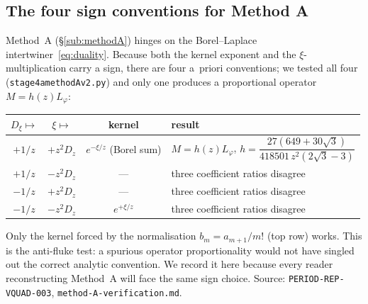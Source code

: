 \documentclass[11pt,reqno]{amsart}
\renewcommand{\_}{\vquadorigunderscore\allowbreak}
\theoremstyle{plain}
\theoremstyle{definition}
\newcommand{\Lphi}{L_{\varphi}}
\begin{document}
\subsection{The four sign conventions for Method A}\label{app:conventions}
Method~A (\S\ref{sub:methodA}) hinges on the Borel--Laplace intertwiner~\eqref{eq:duality}. Because
both the kernel exponent and the $\xi$-multiplication carry a sign, there are four a~priori
conventions; we tested all four (\texttt{stage4a\_methodA\_v2.py}) and only one produces a
proportional operator $M=h(z)\Lphi$:
\begin{center}
\begin{tabular}{@{}cccl@{}}
\hline
$D_\xi\mapsto$ & $\xi\mapsto$ & kernel & result \\
\hline
$+1/z$ & $+z^2D_z$ & $e^{-\xi/z}$ (Borel sum) & $M=h(z)\Lphi$, $h=\dfrac{27(649+30\sqrt3)}{418501\,z^2(2\sqrt3-3)}$ \\
$+1/z$ & $-z^2D_z$ & --- & three coefficient ratios disagree \\
$-1/z$ & $+z^2D_z$ & --- & three coefficient ratios disagree \\
$-1/z$ & $-z^2D_z$ & $e^{+\xi/z}$ & three coefficient ratios disagree \\
\hline
\end{tabular}
\end{center}
Only the kernel forced by the normalisation $b_m=a_{m+1}/m!$ (top row) works. This is the
anti-fluke test: a spurious operator proportionality would not have singled out the correct
analytic convention. We record it here because every reader reconstructing Method~A will face the
same sign choice. Source: \texttt{PERIOD-REP-VQUAD-003}, \texttt{method-A-verification.md}.
\end{document}
